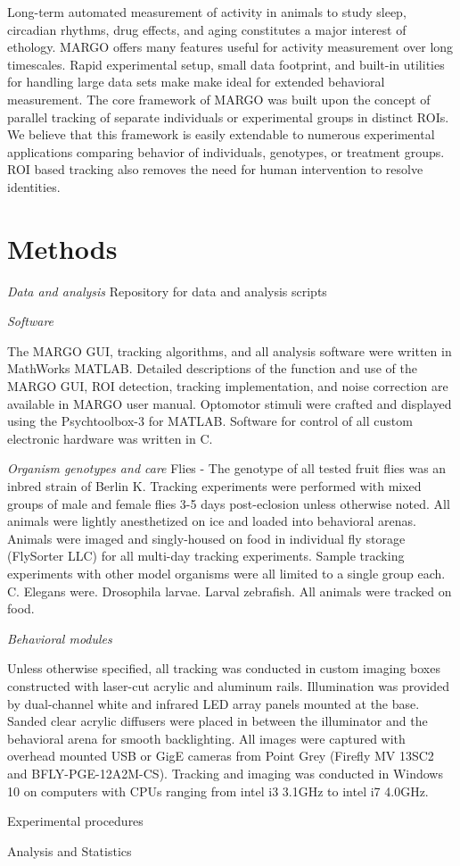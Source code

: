 \documentclass[10pt]{article}
\begin{document}
\begin{multicols}{2}
Long-term automated measurement of activity in animals to study sleep, circadian rhythms, drug effects, and aging constitutes a major interest of ethology. MARGO offers many features useful for activity measurement over long timescales. Rapid experimental setup, small data footprint, and built-in utilities for handling large data sets make make ideal for extended behavioral measurement. The core framework of MARGO was built upon the concept of parallel tracking of separate individuals or experimental groups in distinct ROIs. We believe that this framework is easily extendable to numerous experimental applications comparing behavior of individuals, genotypes, or treatment groups. ROI based tracking also removes the need for human intervention to resolve identities.  

\section{Methods}

\textit{Data and analysis}
Repository for data and analysis scripts

\textit{Software}

The MARGO GUI, tracking algorithms, and all analysis software were written in MathWorks MATLAB. Detailed descriptions of the function and use of the MARGO GUI, ROI detection, tracking implementation, and noise correction are available in MARGO user manual. Optomotor stimuli were crafted and displayed using the Psychtoolbox-3 for MATLAB. Software for control of all custom electronic hardware was written in C.

\textit{Organism genotypes and care}
Flies - The genotype of all tested fruit flies was an inbred strain of  Berlin K. Tracking experiments were performed with mixed groups of male and female flies 3-5 days post-eclosion unless otherwise noted. All animals were lightly anesthetized on ice and loaded into behavioral arenas. Animals were imaged and singly-housed on food in individual fly storage (FlySorter LLC) for all multi-day tracking experiments. 
Sample tracking experiments with other model organisms were all limited to a single group each. C. Elegans were. Drosophila larvae. Larval zebrafish. All animals were tracked on food.


\textit{Behavioral modules}

Unless otherwise specified, all tracking was conducted in custom imaging boxes constructed with laser-cut acrylic and aluminum rails. Illumination was provided by dual-channel white and infrared LED array panels mounted at the base. Sanded clear acrylic diffusers were placed in between the illuminator and the behavioral arena for smooth backlighting. All images were captured with overhead mounted USB or GigE cameras from Point Grey (Firefly MV 13SC2 and BFLY-PGE-12A2M-CS). Tracking and imaging was conducted in Windows 10 on computers with CPUs ranging from intel i3 3.1GHz to intel i7 4.0GHz. 

Experimental procedures


Analysis and Statistics

\end{multicols}
\end{document}
